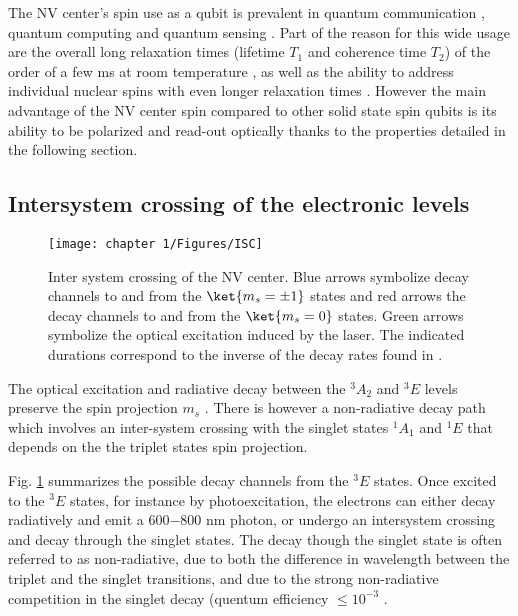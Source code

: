 \documentclass[a4paper, 11pt]{report}
\begin{document}
\bigskip
The NV center's spin use as a qubit is prevalent in quantum communication \citep{wehner2018quantum}, quantum computing \citep{de2021materials} and quantum sensing \citep{degen2017quantum}. Part of the reason for this wide usage are the overall long relaxation times (lifetime $T_1$ and coherence time $T_2$) of the order of a few ms at room temperature \citep{balasubramanian2009ultralong}, as well as the ability to address individual nuclear spins with even longer relaxation times \citep{awschalom2018quantum}. However the main advantage of the NV center spin compared to other solid state spin qubits is its ability to be polarized and read-out optically thanks to the properties detailed in the following section.


\subsection{Intersystem crossing of the electronic levels}
\label{sec ISC}
\begin{figure}[h!]
\centering
\texttt{[image: chapter 1/Figures/ISC]}
\caption{Inter system crossing of the NV center. Blue arrows symbolize decay channels to and from the $\ket{m_s=\pm 1}$ states and red arrows the decay channels to and from the $\ket{m_s=0}$ states. Green arrows symbolize the optical excitation induced by the laser. The indicated durations correspond to the inverse of the decay rates found in \citep{gupta2016efficient}.}
\label{ISC}
\end{figure}

The optical excitation and radiative decay between the $^3A_2$ and $^3E$ levels preserve the spin projection $m_s$ \citep{robledo2011spin}. There is however a non-radiative decay path which involves an inter-system crossing with the singlet states $^1A_1$ and $^1E$ that depends on the the triplet states spin projection.

Fig. \ref{ISC} summarizes the possible decay channels from the $^3E$ states. Once excited to the $^3E$ states, for instance by photoexcitation, the electrons can either decay radiatively and emit a 600$-$800 nm photon, or undergo an intersystem crossing and decay through the singlet states. The decay though the singlet state is often referred to as non-radiative, due to both the difference in wavelength between the triplet and the singlet transitions, and due to the strong non-radiative competition in the singlet decay (quentum efficiency $\leq 10^{-3}$ \citep{rogers2008infrared, ma2010excited, acosta2010optical}.
\end{document}
